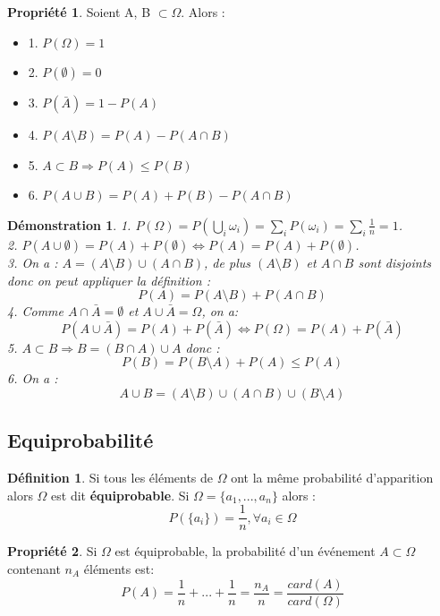 \documentclass[a4paper,12pt]{article}
\newtheorem{Proof}{Démonstration}[section]
\theoremstyle{theorem}
\theoremstyle{definition}
\newtheorem{Propriete}{Propriété}[section]
\theoremstyle{definition}
\theoremstyle{definition}
\newtheorem{Def}{Définition}[section]
\begin{document}
		\begin{Propriete}
			Soient A, B $\subset \Omega$. Alors :
			\begin{itemize}
				\item 1. $P(\Omega) = 1$
				\item 2. $P(\emptyset) = 0$
				\item 3. $P(\bar{A}) = 1-P(A)$
				\item 4. $P(A\setminus B) = P(A)-P(A\cap B)$
				\item 5. $A\subset B \Rightarrow P(A) \leq P(B)$
				\item 6. $P(A\cup B) = P(A)+P(B)-P(A\cap B)$
			\end{itemize}
		\end{Propriete}
	
		\begin{Proof}
			1. $P(\Omega) = P(\bigcup_{i} \omega_{i}) = \sum_{i} P(\omega_{i}) = \sum_{i}\frac{1}{n} = 1$. \\
			2. $P(A\cup \emptyset) = P(A) + P(\emptyset) \iff P(A) = P(A) + P(\emptyset)$. \\
			3. On a : $A = (A\setminus B)\cup (A\cap B)$, de plus $(A\setminus B)$ et $A\cap B$ sont disjoints donc on peut appliquer la définition : 
			\[P(A) = P(A\setminus B) + P(A\cap B)\]
			4. Comme $A\cap \bar{A} = \emptyset$ et $A\cup \bar{A} = \Omega$, on a:
			\[P(A\cup \bar{A}) = P(A) + P(\bar{A}) \iff P(\Omega) = P(A) + P(\bar{A})\]
			5. $A\subset B \Rightarrow B = (B\cap A)\cup A$ donc :
			\[P(B) = P(B\setminus A) + P(A) \leq P(A) \]
			6. On a :
			\[A\cup B = (A\setminus B)\cup (A\cap B)\cup (B\setminus A)\] 
		\end{Proof}
	
	\subsection{Equiprobabilité}
		\begin{Def}
			Si tous les éléments de $\Omega$ ont la même probabilité d'apparition alors $\Omega$ est dit \textbf{équiprobable}. Si $\Omega = \{a_{1},...,a_{n}\}$ alors : 
			\[P(\{a_{i}\}) = \frac{1}{n}, \forall a_{i} \in \Omega \] 
		\end{Def}
	
		\begin{Propriete}
			Si $\Omega$ est équiprobable, la probabilité d'un événement $A\subset \Omega$ contenant $n_{A}$ éléments est:
			\[P(A) = \frac{1}{n} + ... + \frac{1}{n} = \frac{n_{A}}{n} = \frac{card(A)}{card(\Omega)}\]
		\end{Propriete}
	
\end{document}
